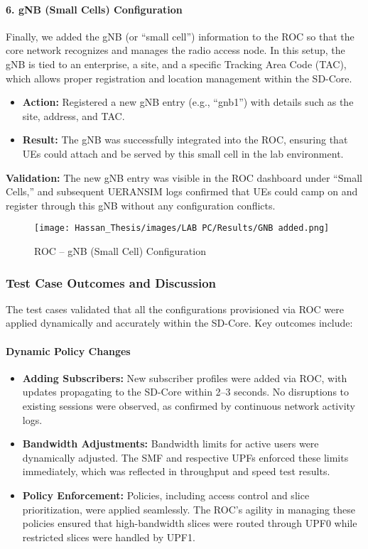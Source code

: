 \paragraph{6. gNB (Small Cells) Configuration}
Finally, we added the gNB (or “small cell”) information to the ROC so that the core network recognizes and manages the radio access node. In this setup, the gNB is tied to an enterprise, a site, and a specific Tracking Area Code (TAC), which allows proper registration and location management within the SD-Core.
\begin{itemize}
    \item \textbf{Action:} Registered a new gNB entry (e.g., “gnb1”) with details such as the site, address, and TAC.
    \item \textbf{Result:} The gNB was successfully integrated into the ROC, ensuring that UEs could attach and be served by this small cell in the lab environment.
\end{itemize}
\textbf{Validation:} The new gNB entry was visible in the ROC dashboard under “Small Cells,” and subsequent UERANSIM logs confirmed that UEs could camp on and register through this gNB without any configuration conflicts.
\begin{figure}[ht]
  \centering
  \texttt{[image: Hassan\_Thesis/images/LAB PC/Results/GNB added.png]}
  \caption{ROC – gNB (Small Cell) Configuration}
  \label{fig:GNBadded}
\end{figure}

\subsubsection{Test Case Outcomes and Discussion}

The test cases validated that all the configurations provisioned via ROC were applied dynamically and accurately within the SD-Core. Key outcomes include:

\paragraph{Dynamic Policy Changes}
\begin{itemize}
    \item \textbf{Adding Subscribers:} New subscriber profiles were added via ROC, with updates propagating to the SD-Core within 2--3 seconds. No disruptions to existing sessions were observed, as confirmed by continuous network activity logs.
    \item \textbf{Bandwidth Adjustments:} Bandwidth limits for active users were dynamically adjusted. The SMF and respective UPFs enforced these limits immediately, which was reflected in throughput and speed test results.
    \item \textbf{Policy Enforcement:} Policies, including access control and slice prioritization, were applied seamlessly. The ROC’s agility in managing these policies ensured that high-bandwidth slices were routed through UPF0 while restricted slices were handled by UPF1.
\end{itemize}

